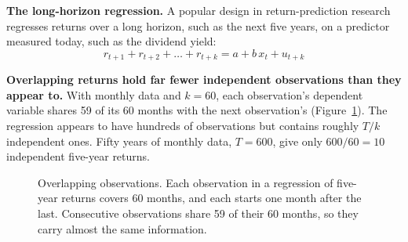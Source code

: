 \textbf{The long-horizon regression.} A popular design in return-prediction research regresses
returns over a long horizon, such as the next five years, on a predictor
measured today, such as the dividend yield:
\begin{equation}
  r_{t+1} + r_{t+2} + \dots + r_{t+k} = a + b\,x_t + u_{t+k}
  \label{eq:03-longhorizon}
\end{equation}

\textbf{Overlapping returns hold far fewer independent observations than they appear to.} With monthly data and $k = 60$,
each observation's dependent variable shares 59 of its 60 months with the next
observation's (Figure~\ref{fig:03-overlap}). The regression appears to have
hundreds of observations but contains roughly $T/k$ independent ones. Fifty
years of monthly data, $T = 600$, give only $600/60 = 10$ independent five-year
returns.




\begin{figure}[!htbp]
  \centering
\caption{Overlapping observations. Each observation in a regression of five-year returns covers 60 months, and each starts one month after the last. Consecutive observations share 59 of their 60 months, so they carry almost the same information.}
\label{fig:03-overlap}
\end{figure}



